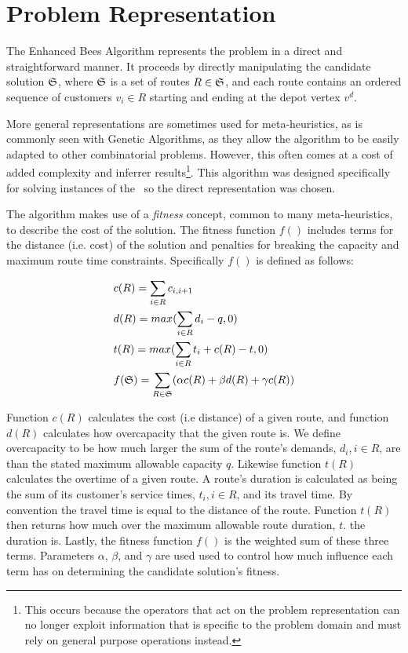 \section{Problem Representation}
\label{sec:problemrepresentation}

The Enhanced Bees Algorithm represents the problem in a direct and straightforward manner. It proceeds by directly manipulating the candidate solution $\mathfrak{S}$, where $\mathfrak{S}$ is a set of routes $R \in \mathfrak{S}$, and each route contains an ordered sequence of customers $v_i \in R$ starting and ending at the depot vertex $v^d$.


More general representations are sometimes used for meta-heuristics, as is commonly seen with Genetic Algorithms, as they allow the algorithm to be easily adapted to other combinatorial problems. However, this often comes at a cost of added complexity and inferrer results\footnote{This occurs because the operators that act on the problem representation can no longer exploit information that is specific to the problem domain and must rely on general purpose operations instead.}. This algorithm was designed specifically for solving instances of the \VRP\ so the direct representation was chosen. 

The algorithm makes use of a \emph{fitness} concept, common to many meta-heuristics, to describe the cost of the solution. The fitness function $f()$ includes terms for the distance (i.e. cost) of the solution and penalties for breaking the capacity and maximum route time constraints. Specifically $f()$ is defined as follows:

\begin{align}
   & c(R) = \sum_{i \in R} c_{i, i+1} \\
   & d(R) = max( \sum_{i \in R} d_i - q, 0 )  \\
   & t(R) = max( \sum_{i \in R} t_i + c(R) - t, 0 )  \\
   & f(\mathfrak{S}) = \sum_{R \in \mathfrak{S}} (\alpha c(R) + \beta d(R) + \gamma c(R))
\end{align}

Function $c(R)$ calculates the cost (i.e distance) of a given route, and function $d(R)$ calculates how overcapacity that the given route is. We define overcapacity to be how much larger the sum of the route's demands, $d_i, i \in R$, are than the stated maximum allowable capacity $q$. Likewise function $t(R)$ calculates the overtime of a given route. A route's duration is calculated as being the sum of its customer's service times, $t_i, i \in R$, and its travel time. By convention the travel time is equal to the distance of the route. Function $t(R)$ then returns how much over the maximum allowable route duration, $t$. the duration is. Lastly, the fitness function $f()$ is the weighted sum of these three terms. Parameters $\alpha$, $\beta$, and $\gamma$ are used used to control how much influence each term has on determining the candidate solution's fitness.

